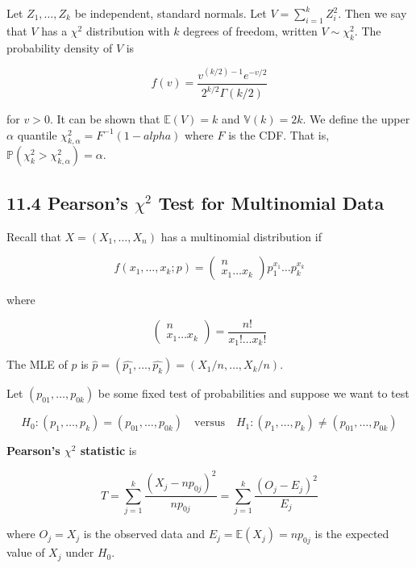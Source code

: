 Let \(Z_{1}, \dots, Z_{k}\) be independent, standard normals. Let
\(V = \sum_{i=1}^{k} Z_{i}^{2}\). Then we say that \(V\) has a \(\chi^{2}\)
distribution with \(k\) degrees of freedom, written \(V \sim \chi^{2}_{k}\).
The probability density of \(V\) is

\[ f(v) = \frac{v^{(k/2) - 1}e^{-v/2}}{2^{k/2} \Gamma(k / 2)} \]

for \(v > 0\). It can be shown that \(\mathbb{E}(V) = k\) and
\(\mathbb{V}(k) = 2k\). We define the upper \(\alpha\) quantile
\(\chi^{2}_{k, \alpha} = F^{-1}(1 - alpha)\) where \(F\) is the CDF. That
is, \(\mathbb{P}(\chi^{2}_{k} > \chi^{2}_{k, \alpha}) = \alpha\).

\subsection*{\texorpdfstring{11.4 Pearson's \(\chi^{2}\) Test for
Multinomial
Data}{11.4 Pearson's \textbackslash chi^{2} Test for Multinomial Data}}\label{pearsons-chi2-test-for-multinomial-data}

Recall that \(X = (X_{1}, \dots, X_{n})\) has a multinomial distribution if

\[ f(x_{1}, \dots, x_{k}; p) = \begin{pmatrix}
n \\
x_{1} \dots x_{k}
\end{pmatrix} p_{1}^{x_{1}} \dots p_{k}^{x_{k}}\]

where

\[
\begin{pmatrix}
n \\
x_{1} \dots x_{k}
\end{pmatrix} = 
\frac{n!}{x_{1}! \dots x_{k}!}
\]

The MLE of \(p\) is
\(\hat{p} = (\hat{p_{1}}, \dots, \hat{p_{k}}) = \left(X_{1} / n, \dots, X_{k} / n\right)\).

Let \((p_{01}, \dots, p_{0k})\) be some fixed test of probabilities and
suppose we want to test

\[ H_{0}: (p_{1}, \dots, p_{k}) = (p_{01}, \dots, p_{0k})
\quad \text{versus} \quad
H_{1}: (p_{1}, \dots, p_{k}) \neq (p_{01}, \dots, p_{0k})\]

\textbf{Pearson's \(\chi^{2}\) statistic} is

\[ T = \sum_{j=1}^{k} \frac{(X_{j} - np_{0j})^{2}}{np_{0j}} = \sum_{j=1}^{k} \frac{(O_{j} - E_{j})^{2}}{E_{j}}\]

where \(O_{j} = X_{j}\) is the observed data and
\(E_{j} = \mathbb{E}(X_{j}) = np_{0j}\) is the expected value of \(X_{j}\)
under \(H_{0}\).

